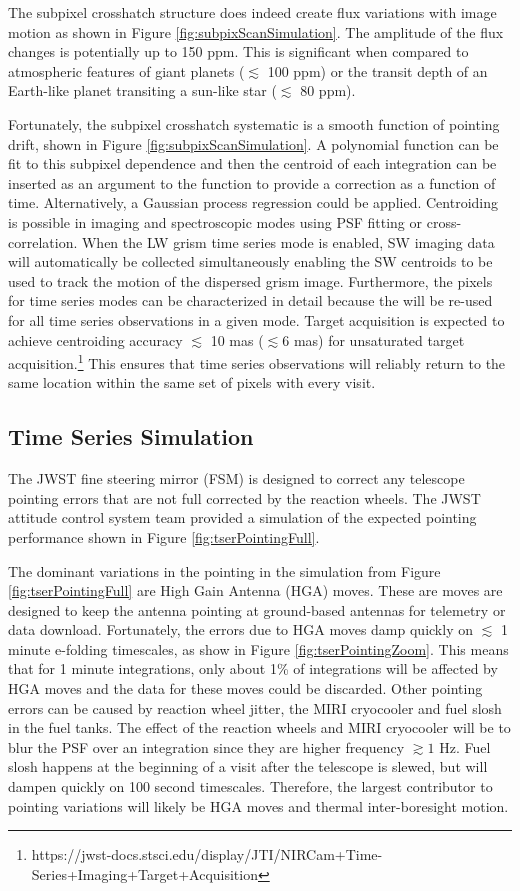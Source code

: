 \documentclass{aastex62}
\begin{document}
The subpixel crosshatch structure does indeed create flux variations with image motion as shown in Figure \ref{fig:subpixScanSimulation}.
The amplitude of the flux changes is potentially up to 150 ppm.
This is significant when compared to atmospheric features of giant planets ($\lesssim$ 100 ppm) or the transit depth of an Earth-like planet transiting a sun-like star ($\lesssim$ 80 ppm).

Fortunately, the subpixel crosshatch systematic is a smooth function of pointing drift, shown in Figure \ref{fig:subpixScanSimulation}.
A polynomial function can be fit to this subpixel dependence and then the centroid of each integration can be inserted as an argument to the function to provide a correction as a function of time.
Alternatively, a Gaussian process regression could be applied.
Centroiding is possible in imaging and spectroscopic modes using PSF fitting or cross-correlation.
When the LW grism time series mode is enabled, SW imaging data will automatically be collected simultaneously enabling the SW centroids to be used to track the motion of the dispersed grism image.
Furthermore, the pixels for time series modes can be characterized in detail because the will be re-used for all time series observations in a given mode.
Target acquisition is expected to achieve centroiding accuracy $\lesssim$ 10 mas ($\lesssim 6$ mas) for unsaturated target acquisition.\footnote{https://jwst-docs.stsci.edu/display/JTI/NIRCam+Time-Series+Imaging+Target+Acquisition}
This ensures that time series observations will reliably return to the same location within the same set of pixels with every visit.

\subsection{Time Series Simulation}
The JWST fine steering mirror (FSM) is designed to correct any telescope pointing errors that are not full corrected by the reaction wheels.
The JWST attitude control system team provided a simulation of the expected pointing performance shown in Figure \ref{fig:tserPointingFull}.

The dominant variations in the pointing in the simulation from Figure \ref{fig:tserPointingFull} are High Gain Antenna (HGA) moves.
These are moves are designed to keep the antenna pointing at ground-based antennas for telemetry or data download.
Fortunately, the errors due to HGA moves damp quickly on $\lesssim$ 1 minute e-folding timescales, as show in Figure \ref{fig:tserPointingZoom}.
This means that for 1 minute integrations, only about 1\% of integrations will be affected by HGA moves and the data for these moves could be discarded.
Other pointing errors can be caused by reaction wheel jitter, the MIRI cryocooler and fuel slosh in the fuel tanks.
The effect of the reaction wheels and MIRI cryocooler will be to blur the PSF over an integration since they are higher frequency $\gtrsim 1$ Hz.
Fuel slosh happens at the beginning of a visit after the telescope is slewed, but will dampen quickly on 100 second timescales.
Therefore, the largest contributor to pointing variations will likely be HGA moves and thermal inter-boresight motion.
\end{document}
